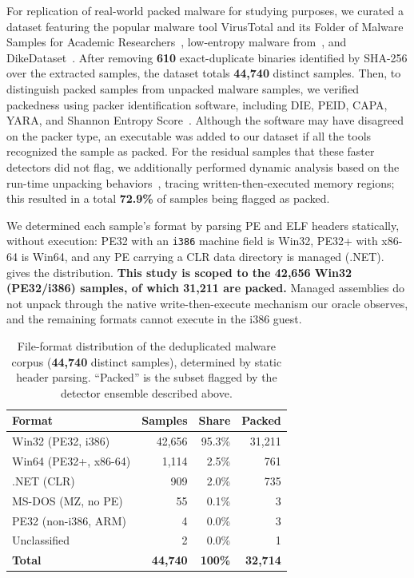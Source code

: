 For replication of real-world packed malware for studying purposes, we curated a
dataset featuring the popular malware tool VirusTotal and its Folder of Malware
Samples for Academic Researchers~\cite{virustotal}, low-entropy malware
from~\cite{mantovani2020prevalence}, and DikeDataset~\cite{dikedataset}. After
removing \textbf{610} exact-duplicate binaries identified by SHA-256 over the
extracted samples, the dataset totals \textbf{44,740} distinct samples. Then, to
distinguish packed samples from unpacked malware samples, we verified packedness
using packer identification software, including DIE, PEID, CAPA, YARA, and
Shannon Entropy Score~\cite{yara,die,manalyze,capa,pefile,lyda2007entropy,peid}.
Although the software may have disagreed on the packer type, an executable was
added to our dataset if all the tools recognized the sample as packed. For the
residual samples that these faster detectors did not flag, we additionally
performed dynamic analysis based on the run-time unpacking
behaviors~\cite{ugartepedrero2015sok}, tracing written-then-executed memory
regions; this resulted in a total \textbf{72.9\%} of samples being flagged as
packed.

We determined each sample's format by parsing PE and ELF headers statically,
without execution: PE32 with an \texttt{i386} machine field is Win32, PE32+ with
x86-64 is Win64, and any PE carrying a CLR data directory is managed (.NET).
 gives the distribution. \textbf{This study is scoped to the
42,656 Win32 (PE32/i386) samples, of which 31,211 are packed.} Managed assemblies
do not unpack through the native write-then-execute mechanism our oracle observes,
and the remaining formats cannot execute in the i386 guest.

\begin{table}[t]
\centering
\caption{File-format distribution of the deduplicated malware corpus
(\textbf{44,740} distinct samples), determined by static header parsing.
``Packed'' is the subset flagged by the detector ensemble described above.}
\label{tab:filetypes}
\footnotesize
\begin{tabular}{@{}lrrr@{}}
\toprule
Format & Samples & Share & Packed \\
\midrule
Win32 (PE32, i386)      & 42,656 & 95.3\% & 31,211 \\
Win64 (PE32+, x86-64)   &  1,114 &  2.5\% &    761 \\
.NET (CLR)              &    909 &  2.0\% &    735 \\
MS-DOS (MZ, no PE)      &     55 &  0.1\% &      3 \\
PE32 (non-i386, ARM)    &      4 &  0.0\% &      3 \\
Unclassified            &      2 &  0.0\% &      1 \\
\midrule
\textbf{Total}          & \textbf{44,740} & \textbf{100\%} & \textbf{32,714} \\
\bottomrule
\end{tabular}
\end{table}

